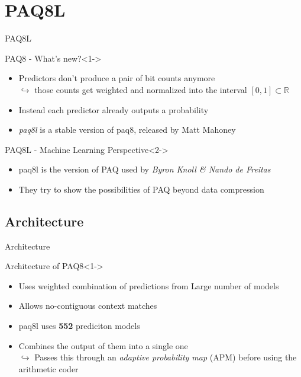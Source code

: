 \documentclass[11pt,usenames,dvipsnames]{beamer}
\begin{document}
\section{PAQ8L}
\begin{frame}{PAQ8L}
	\begin{exampleblock}{PAQ8 - What's new?}<1->
		\begin{itemize}
			\item Predictors don't produce a pair of bit counts anymore\\
			$\hookrightarrow$ those counts get weighted and normalized into the interval $[0,1]\subset\mathbb{R}$
			\item Instead  each predictor already outputs a probability
			\item \textit{paq8l} is a stable version of paq8, released by Matt Mahoney
		\end{itemize}
	\end{exampleblock}
	
		\begin{alertblock}{PAQ8L - Machine Learning Perspective}<2->
		\begin{itemize}
			\item paq8l is the version of PAQ used by \textit{Byron Knoll \& Nando de Freitas}
			\item They try to show the possibilities of PAQ beyond data compression
		\end{itemize}
	\end{alertblock}
\end{frame}

\subsection{Architecture}
\begin{frame}{Architecture}


	

	\begin{exampleblock}{Architecture of PAQ8}<1->
		\begin{itemize}
			\item Uses weighted combination of predictions from Large number of models
			\item Allows no-contiguous context matches
			\item paq8l uses \textbf{552} prediciton models
			\item Combines the output of them into a single one\\
			$\hookrightarrow$ Passes this through an \textit{adaptive probability map} (APM) before using the arithmetic coder
		\end{itemize}
	\end{exampleblock}
	\hfill
	

	

\end{frame}
\end{document}
